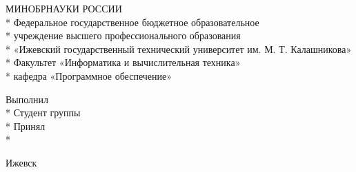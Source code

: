 \begin{titlepage}
\newpage

\begin{center}
МИНОБРНАУКИ РОССИИ\\*
Федеральное государственное бюджетное образовательное\\*
учреждение высшего профессионального образования\\*
«Ижевский государственный технический университет им. М. Т. Калашникова»\\*
Факультет «Информатика и вычислительная техника»\\*
кафедра «Программное обеспечение»
\vspace{1cm}
\end{center}

\vspace{8em}

\begin{center}
\titletext
\end{center}

\vspace{2.5em}

\vspace{6em}

\begin{flushleft}
    Выполнил\\*
    Студент группы \mygroup \hfill \myname\\*
    \vspace{1.5em}
    Принял \hfill \myteacher\\*
\end{flushleft}

\vspace{\fill}

\begin{center}
    Ижевск \myyear
\end{center}

\end{titlepage}
